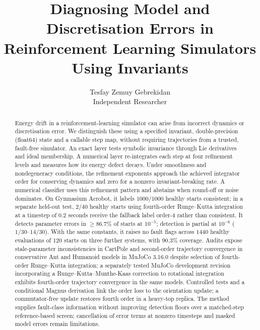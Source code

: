\documentclass[10pt]{article}
\title{Diagnosing Model and Discretisation Errors in Reinforcement Learning Simulators Using Invariants}
\author{Tesfay Zemuy Gebrekidan\\
  Independent Researcher}
\date{}
\theoremstyle{definition}
\begin{document}
\maketitle
\begingroup
\renewcommand{\thefootnote}{}
\endgroup

\begin{abstract}
Energy drift in a reinforcement-learning simulator can arise from incorrect
dynamics or discretisation error. We distinguish these using a specified
invariant, double-precision (float64) state and a callable step map, without
requiring trajectories from a trusted, fault-free simulator. An exact
layer tests symbolic invariance through Lie derivatives and ideal membership.
A numerical layer re-integrates each step at four refinement levels and
measures how its energy defect decays. Under smoothness and nondegeneracy
conditions, the refinement exponents approach the achieved integrator order
for conserving dynamics and zero for a nonzero invariant-breaking rate. A
numerical classifier uses this refinement pattern and abstains when round-off or noise
dominates. On Gymnasium Acrobot, it labels $1000/1000$ healthy starts consistent;
in a separate held-out test, $2/40$ healthy starts using fourth-order
Runge--Kutta integration at a timestep of $0.2$ seconds receive
the fallback label order-4 rather than consistent. It detects parameter errors
in $\ge86.7\%$ of starts at $10^{-5}$; detection is partial at $10^{-6}$ ($1/30$--$14/30$). With the same constants,
it raises no fault flags across $1440$ healthy evaluations of $120$ starts on
three further systems, with $90.3\%$ coverage. Audits expose stale-parameter
inconsistencies in CartPole and second-order trajectory convergence in
conservative Ant and Humanoid models in MuJoCo 3.16.0 despite selection of
fourth-order Runge--Kutta integration;
a separately tested MuJoCo development revision incorporating a
Runge--Kutta--Munthe-Kaas correction to rotational integration exhibits
fourth-order trajectory convergence in the same models. Controlled tests
and a conditional Magnus derivation link the order loss to the orientation update;
a commutator-free update restores fourth order in a heavy-top replica. The
method supplies fault-class information without improving detection floors
over a matched-step reference-based screen; cancellation of error terms at nonzero timesteps and
masked model errors remain limitations.
\end{abstract}
\end{document}
